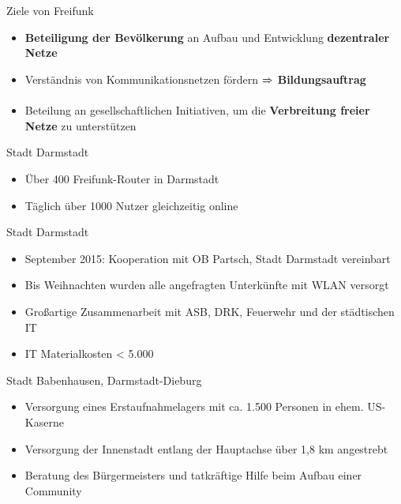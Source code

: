 \documentclass[t]{beamer}
\begin{document}
  \begin{frame}{Ziele von Freifunk}
    \begin{itemize}
      \item \textbf{Beteiligung der Bevölkerung} an Aufbau und Entwicklung \textbf{dezentraler Netze}
      \item Verständnis von Kommunikationsnetzen fördern $\xRightarrow{}$ \textbf{Bildungsauftrag}
      \item Beteilung an gesellschaftlichen Initiativen, um die \textbf{Verbreitung freier Netze} zu unterstützen
    \end{itemize}
  \end{frame}


  \begin{frame}{Stadt Darmstadt}
    \begin{itemize}
      \item Über 400 Freifunk-Router in Darmstadt
      \item Täglich über 1000 Nutzer gleichzeitig online
    \end{itemize}
  \end{frame}

  \begin{frame}{Stadt Darmstadt}
    \begin{itemize}
      \item September 2015: Kooperation mit OB Partsch, Stadt Darmstadt vereinbart
      \item Bis Weihnachten wurden alle angefragten Unterkünfte mit WLAN versorgt
      \item Großartige Zusammenarbeit mit ASB, DRK, Feuerwehr und der städtischen IT
      \item IT Materialkosten < 5.000 \texteuro
    \end{itemize}
  \end{frame}

  \begin{frame}{Stadt Babenhausen, Darmstadt-Dieburg}
    \begin{itemize}
      \item Versorgung eines Erstaufnahmelagers mit ca. 1.500 Personen in ehem. US-Kaserne
      \item Versorgung der Innenstadt entlang der Hauptachse über 1,8 km angestrebt
      \item Beratung des Bürgermeisters und tatkräftige Hilfe beim Aufbau einer Community
    \end{itemize}
  \end{frame}
\end{document}
